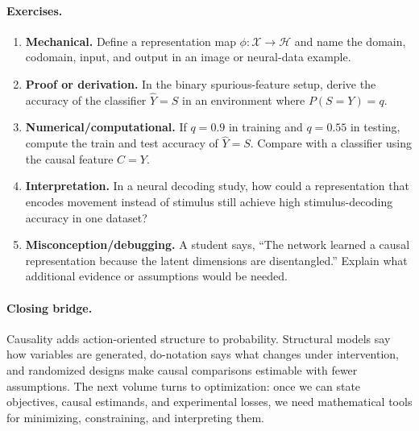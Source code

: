 \paragraph{Exercises.}
\begin{enumerate}[label=\textbf{19.4.\arabic*.}, leftmargin=*]
\item \textbf{Mechanical.} Define a representation map \(\phi:\mathcal X\to\mathcal H\) and name the domain, codomain, input, and output in an image or neural-data example.
\item \textbf{Proof or derivation.} In the binary spurious-feature setup, derive the accuracy of the classifier \(\hat Y=S\) in an environment where \(P(S=Y)=q\).
\item \textbf{Numerical/computational.} If \(q=0.9\) in training and \(q=0.55\) in testing, compute the train and test accuracy of \(\hat Y=S\). Compare with a classifier using the causal feature \(C=Y\).
\item \textbf{Interpretation.} In a neural decoding study, how could a representation that encodes movement instead of stimulus still achieve high stimulus-decoding accuracy in one dataset?
\item \textbf{Misconception/debugging.} A student says, ``The network learned a causal representation because the latent dimensions are disentangled.'' Explain what additional evidence or assumptions would be needed.
\end{enumerate}

\paragraph{Closing bridge.}
Causality adds action-oriented structure to probability. Structural models say how variables are generated, do-notation says what changes under intervention, and randomized designs make causal comparisons estimable with fewer assumptions. The next volume turns to optimization: once we can state objectives, causal estimands, and experimental losses, we need mathematical tools for minimizing, constraining, and interpreting them.

\clearpage
